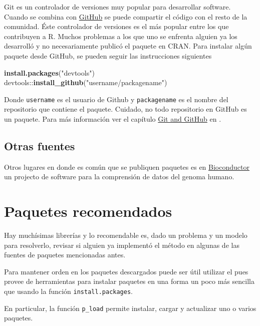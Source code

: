 \documentclass[]{article}
\newenvironment{Shaded}{\begin{snugshade}}{\end{snugshade}}
\newcommand{\KeywordTok}[1]{\textcolor[rgb]{0.13,0.29,0.53}{\textbf{{#1}}}}
\newcommand{\StringTok}[1]{\textcolor[rgb]{0.31,0.60,0.02}{{#1}}}
\newcommand{\NormalTok}[1]{{#1}}
\begin{document}
Git es un controlador de versiones muy popular para desarrollar
software. Cuando se combina con \href{https://github.com/}{GitHub} se
puede compartir el código con el resto de la comunidad. Éste controlador
de versiones es el más popular entre los que contribuyen a R. Muchos
problemas a los que uno se enfrenta alguien ya los desarrolló y no
necesariamente publicó el paquete en CRAN. Para instalar algún paquete
desde GitHub, se pueden seguir las instrucciones siguientes

\begin{Shaded}
\begin{Highlighting}[]
\KeywordTok{install.packages}\NormalTok{(}\StringTok{"devtools"}\NormalTok{)}
\NormalTok{devtools::}\KeywordTok{install_github}\NormalTok{(}\StringTok{"username/packagename"}\NormalTok{)}
\end{Highlighting}
\end{Shaded}

Donde \texttt{username} es el usuario de Github y \texttt{packagename}
es el nombre del repositorio que contiene el paquete. Cuidado, no todo
repositorio en GitHub es un paquete. Para más información ver el
capítulo \href{http://r-pkgs.had.co.nz/git.html}{Git and GitHub} en
\textcite{wickham2015r}.

\subsection{Otras fuentes}\label{otras-fuentes}

Otros lugares en donde es común que se publiquen paquetes es en
\href{https://www.bioconductor.org/}{Bioconductor} un projecto de
software para la comprensión de datos del genoma humano.

\section{Paquetes recomendados}\label{paquetes-recomendados}

Hay muchísimas librerías y lo recomendable es, dado un problema y un
modelo para resolverlo, revisar si alguien ya implementó el método en
algunas de las fuentes de paquetes mencionadas antes.

Para mantener orden en los paquetes descargados puede ser útil utilizar
el \textcite{pacman} pues provee de herramientas para instalar paquetes
en una forma un poco más sencilla que usando la función
\texttt{install.packages}.

En particular, la función \texttt{p\_load} permite instalar, cargar y
actualizar uno o varios paquetes.
\end{document}

